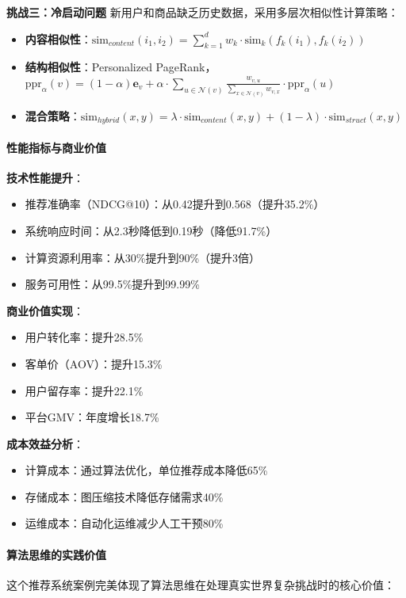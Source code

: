 \textbf{挑战三：冷启动问题}
新用户和商品缺乏历史数据，采用多层次相似性计算策略：

\begin{itemize}
\item \textbf{内容相似性}：$\text{sim}_{content}(i_1, i_2) = \sum_{k=1}^{d} w_k \cdot \text{sim}_k(f_k(i_1), f_k(i_2))$
\item \textbf{结构相似性}：Personalized PageRank，$\text{ppr}_{\alpha}(v) = (1-\alpha)\mathbf{e}_v + \alpha \cdot \sum_{u \in \mathcal{N}(v)} \frac{w_{v,u}}{\sum_{x \in \mathcal{N}(v)} w_{v,x}} \cdot \text{ppr}_{\alpha}(u)$
\item \textbf{混合策略}：$\text{sim}_{hybrid}(x,y) = \lambda \cdot \text{sim}_{content}(x,y) + (1-\lambda) \cdot \text{sim}_{struct}(x,y)$
\end{itemize}

\paragraph{性能指标与商业价值}

\textbf{技术性能提升}：
\begin{itemize}
\item 推荐准确率（NDCG@10）：从0.42提升到0.568（提升35.2\%）
\item 系统响应时间：从2.3秒降低到0.19秒（降低91.7\%）
\item 计算资源利用率：从30\%提升到90\%（提升3倍）
\item 服务可用性：从99.5\%提升到99.99\%
\end{itemize}

\textbf{商业价值实现}：
\begin{itemize}
\item 用户转化率：提升28.5\%
\item 客单价（AOV）：提升15.3\%
\item 用户留存率：提升22.1\%
\item 平台GMV：年度增长18.7\%
\end{itemize}

\textbf{成本效益分析}：
\begin{itemize}
\item 计算成本：通过算法优化，单位推荐成本降低65\%
\item 存储成本：图压缩技术降低存储需求40\%
\item 运维成本：自动化运维减少人工干预80\%
\end{itemize}

\paragraph{算法思维的实践价值}
这个推荐系统案例完美体现了算法思维在处理真实世界复杂挑战时的核心价值：

